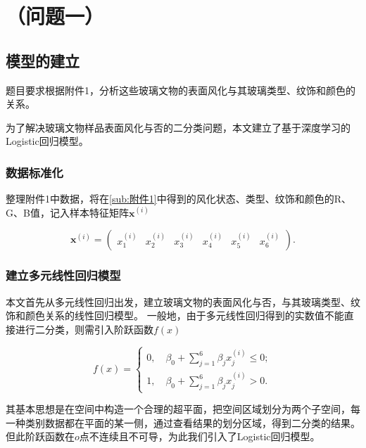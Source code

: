 \section{（问题一）} %
\label{sec:section_}

\subsection{模型的建立} %
\label{sub:模型的建立}

题目要求根据附件1，分析这些玻璃文物的表面风化与其玻璃类型、纹饰和颜色的关系。

为了解决玻璃文物样品表面风化与否的二分类问题，本文建立了基于深度学习的Logistic回归模型。

\subsubsection{数据标准化} %
\label{ssub:数据标准化}

整理附件1中数据，将在\ref{sub:附件1}中得到的风化状态、类型、纹饰和颜色的R、G、B值，记入样本特征矩阵$\boldsymbol{x}^{(i)}$

\begin{equation}
	\boldsymbol{x}^{(i)}=\left(\begin{array}{cccccc}x_{1}^{(i)}& x_{2}^{(i)}& x_{3}^{(i)}& x_{4}^{(i)}& x_{5}^{(i)}& x_{6}^{(i)}\end{array}\right).
\end{equation}


\subsubsection{建立多元线性回归模型} %
\label{ssub:建立多元线性回归模型}

本文首先从多元线性回归出发，建立玻璃文物的表面风化与否，与其玻璃类型、纹饰和颜色关系的线性回归模型。
一般地，由于多元线性回归得到的实数值不能直接进行二分类，则需引入阶跃函数$f(x)$

\begin{equation}
f(x)=\left\{\begin{array}{l}
0,\quad \beta_{0}+\sum_{j=1}^{6} \beta_{j} x_{j}^{(i)} \leqslant 0;\\
1,\quad \beta_{0}+\sum_{j=1}^{6} \beta_{j} x_{j}^{(i)}>0.
\end{array}\right.
\end{equation}

其基本思想是在空间中构造一个合理的超平面，把空间区域划分为两个子空间，每一种类别数据都在平面的某一侧，通过查看结果的划分区域，得到二分类的结果。
但此阶跃函数在$o$点不连续且不可导，为此我们引入了Logistic回归模型。


